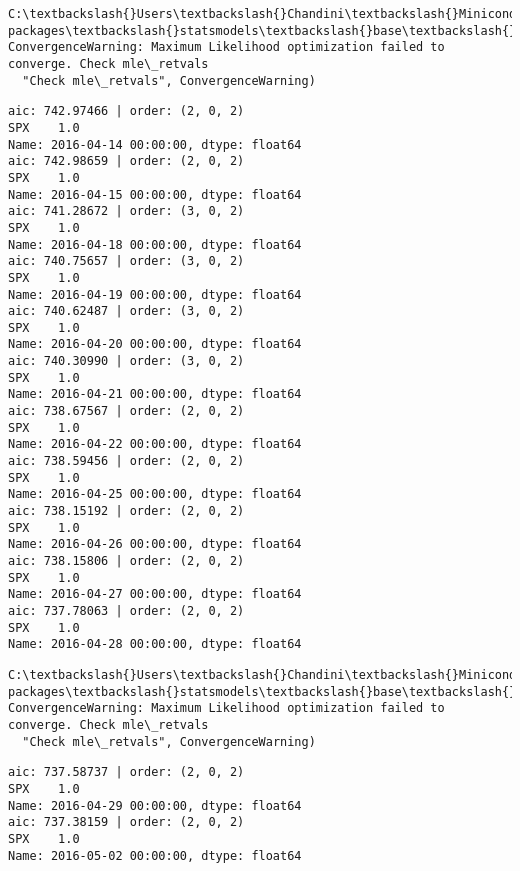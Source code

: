 \documentclass[11pt]{article}
\begin{document}
    \begin{Verbatim}[commandchars=\\\{\}]
C:\textbackslash{}Users\textbackslash{}Chandini\textbackslash{}Miniconda3\textbackslash{}envs\textbackslash{}auquan\textbackslash{}lib\textbackslash{}site-packages\textbackslash{}statsmodels\textbackslash{}base\textbackslash{}model.py:496: ConvergenceWarning: Maximum Likelihood optimization failed to converge. Check mle\_retvals
  "Check mle\_retvals", ConvergenceWarning)

    \end{Verbatim}

    \begin{Verbatim}[commandchars=\\\{\}]
aic: 742.97466 | order: (2, 0, 2)
SPX    1.0
Name: 2016-04-14 00:00:00, dtype: float64
aic: 742.98659 | order: (2, 0, 2)
SPX    1.0
Name: 2016-04-15 00:00:00, dtype: float64
aic: 741.28672 | order: (3, 0, 2)
SPX    1.0
Name: 2016-04-18 00:00:00, dtype: float64
aic: 740.75657 | order: (3, 0, 2)
SPX    1.0
Name: 2016-04-19 00:00:00, dtype: float64
aic: 740.62487 | order: (3, 0, 2)
SPX    1.0
Name: 2016-04-20 00:00:00, dtype: float64
aic: 740.30990 | order: (3, 0, 2)
SPX    1.0
Name: 2016-04-21 00:00:00, dtype: float64
aic: 738.67567 | order: (2, 0, 2)
SPX    1.0
Name: 2016-04-22 00:00:00, dtype: float64
aic: 738.59456 | order: (2, 0, 2)
SPX    1.0
Name: 2016-04-25 00:00:00, dtype: float64
aic: 738.15192 | order: (2, 0, 2)
SPX    1.0
Name: 2016-04-26 00:00:00, dtype: float64
aic: 738.15806 | order: (2, 0, 2)
SPX    1.0
Name: 2016-04-27 00:00:00, dtype: float64
aic: 737.78063 | order: (2, 0, 2)
SPX    1.0
Name: 2016-04-28 00:00:00, dtype: float64

    \end{Verbatim}

    \begin{Verbatim}[commandchars=\\\{\}]
C:\textbackslash{}Users\textbackslash{}Chandini\textbackslash{}Miniconda3\textbackslash{}envs\textbackslash{}auquan\textbackslash{}lib\textbackslash{}site-packages\textbackslash{}statsmodels\textbackslash{}base\textbackslash{}model.py:496: ConvergenceWarning: Maximum Likelihood optimization failed to converge. Check mle\_retvals
  "Check mle\_retvals", ConvergenceWarning)

    \end{Verbatim}

    \begin{Verbatim}[commandchars=\\\{\}]
aic: 737.58737 | order: (2, 0, 2)
SPX    1.0
Name: 2016-04-29 00:00:00, dtype: float64
aic: 737.38159 | order: (2, 0, 2)
SPX    1.0
Name: 2016-05-02 00:00:00, dtype: float64

    \end{Verbatim}
\end{document}
